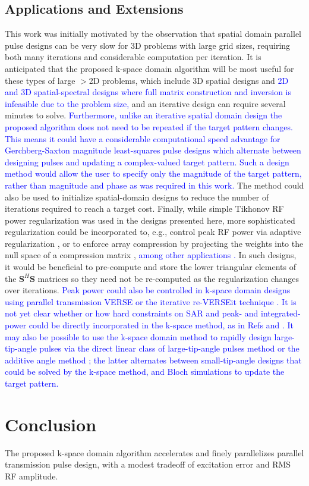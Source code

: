 \subsection*{Applications and Extensions}
This work was initially motivated by the observation that spatial domain parallel pulse designs can be very slow
for 3D problems with large grid sizes, 
requiring both many iterations and considerable computation per iteration. 
It is anticipated that the proposed k-space domain algorithm will be most useful for these types of large $>$2D problems,
which include 3D spatial designs \cite{malik2012tailored,davids2016fast} 
and \textcolor{blue}{2D and 3D spatial-spectral designs \cite{stenger2000three,setsompop2009,Malik:2010aa,yang2010four}
where full matrix construction and inversion is infeasible due to the problem size, }
and an iterative design can require several minutes to solve. 
\textcolor{blue}{Furthermore, unlike an iterative spatial domain design the proposed algorithm does not need to be repeated if the target pattern changes.
This means it could have a considerable computational speed advantage for Gerchberg-Saxton magnitude least-squares pulse designs \cite{setsompop2008magnitude,malik:mrm:2015}
which alternate between designing pulses and updating a complex-valued target pattern.
Such a design method would allow the user to specify only the magnitude of the target pattern, 
rather than magnitude and phase as was required in this work.}
The method could also be used to initialize spatial-domain designs to reduce the number of iterations required to reach a target cost. 
Finally, while simple Tikhonov RF power regularization was used in the designs presented here,
more sophisticated regularization could be incorporated to, 
e.g., control peak RF power via adaptive regularization \cite{Yip:2005:Magn-Reson-Med:16155881},
or to enforce array compression by projecting the weights into the null space of a compression matrix \cite{cao2016array},
\textcolor{blue}{among other applications \cite{padormo:2016,deniz:2019}.} 
In such designs, it would be beneficial to pre-compute and store the lower triangular elements of the $\bm{S}^H\bm{S}$ matrices
so they need not be re-computed as the regularization changes over iterations.  
\textcolor{blue}{Peak power could also be controlled in k-space domain designs using parallel transmission 
VERSE \cite{Lee:2011:MRM} or the iterative re-VERSEit technique \cite{lee2009tod}.} 
\textcolor{blue}{It is not yet clear whether or how hard constraints on SAR and 
peak- and integrated-power could be directly incorporated in the k-space method, as in Refs \cite{brunner2010optimal} and \cite{hoyos:tmi:2014}. }
\textcolor{blue}{It may also be possible to use the k-space domain method to rapidly design large-tip-angle pulses via the direct linear class of large-tip-angle pulses method \cite{Xu:2008aa} or the additive angle method \cite{grissom:mrm:2008}; 
the latter alternates between small-tip-angle designs that could be solved by the k-space method, 
and Bloch simulations to update the target pattern.} 


\section*{Conclusion}
The proposed k-space domain algorithm accelerates and finely parallelizes parallel transmission pulse design,
with a modest tradeoff of excitation error and RMS RF amplitude.